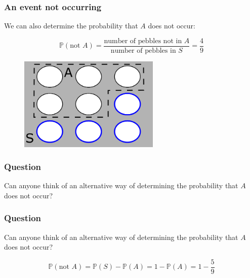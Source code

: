 \documentclass{beamer}
\begin{document}
		\begin{frame}
		\frametitle{An event not occurring}
		We can also determine the probability that $A$ does not occur:
		
		\begin{equation}
			\mathbb{P}(\text{not } A) = \frac{\text{number of pebbles not in } A}{\text{number of pebbles in } S} = \frac{4}{9}
		\end{equation}
		
		\begin{figure}[ht]
			\centerline{\includegraphics[width=0.6\textwidth]{./figures/pebble_world_probnota.png}}
		\end{figure}
		
	\end{frame}

	\begin{frame}
		\frametitle{Question}
		
		\Large Can anyone think of an alternative way of determining the probability that $A$ does not occur?
		
	\end{frame}

	\begin{frame}
		\frametitle{Question}
		
		\Large Can anyone think of an alternative way of determining the probability that $A$ does not occur?
		
		\begin{equation}
			\mathbb{P}(\text{not } A) = \mathbb{P}(S) - \mathbb{P}(A) = 1 - \mathbb{P}(A) = 1 - \frac{5}{9}
		\end{equation}
		
	\end{frame}
\end{document}

